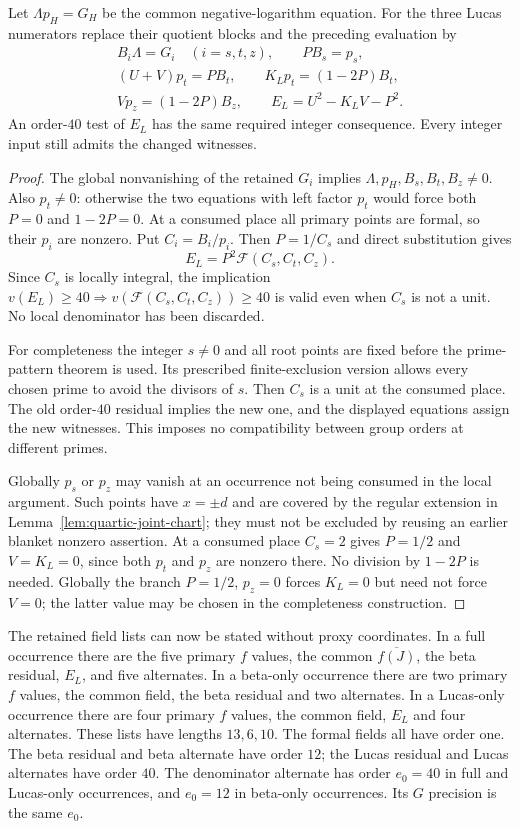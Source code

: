 \begin{lemma}
\label{lem:quartic-normalized-lucas}
Let $\Lambda p_H=G_H$ be the common negative-logarithm equation. For the
three Lucas numerators replace their quotient blocks and the preceding
evaluation by
\begin{gather*}
 B_i\Lambda=G_i\quad(i=s,t,z),\qquad P B_s=p_s,\\
 (U+V)p_t=P B_t,\qquad K_Lp_t=(1-2P)B_t,\\
 Vp_z=(1-2P)B_z,\qquad E_L=U^2-K_LV-P^2.
\end{gather*}
An order-$40$ test of $E_L$ has the same required integer consequence.
Every integer input still admits the changed witnesses.
\end{lemma}
\begin{proof}
The global nonvanishing of the retained $G_i$ implies
$\Lambda,p_H,B_s,B_t,B_z\ne0$. Also $p_t\ne0$: otherwise the two
equations with left factor $p_t$ would force both $P=0$ and $1-2P=0$.
At a consumed place all primary points are formal, so their $p_i$ are
nonzero. Put $C_i=B_i/p_i$. Then $P=1/C_s$ and direct substitution gives
\[
 E_L=P^2\mathcal F(C_s,C_t,C_z).
\]
Since $C_s$ is locally integral, the implication
$v(E_L)\ge40\Rightarrow v(\mathcal F(C_s,C_t,C_z))\ge40$ is valid even
when $C_s$ is not a unit. No local denominator has been discarded.

For completeness the integer $s\ne0$ and all root points are fixed before
the prime-pattern theorem is used. Its prescribed finite-exclusion version
allows every chosen prime to avoid the divisors of $s$. Then $C_s$ is a
unit at the consumed place. The old order-$40$ residual implies the new
one, and the displayed equations assign the new witnesses. This imposes
no compatibility between group orders at different primes.

Globally $p_s$ or $p_z$ may vanish at an occurrence not being consumed in
the local argument. Such points have $x=\pm d$ and are covered by the
regular extension in Lemma~\ref{lem:quartic-joint-chart}; they must not be
excluded by reusing an earlier blanket nonzero assertion. At a consumed
place $C_s=2$ gives $P=1/2$ and $V=K_L=0$, since both $p_t$ and $p_z$
are nonzero there. No division by $1-2P$ is needed. Globally the branch
$P=1/2$, $p_z=0$ forces $K_L=0$ but need not force $V=0$; the latter
value may be chosen in the completeness construction.
\end{proof}

The retained field lists can now be stated without proxy coordinates.
In a full occurrence there are the five primary $f$ values, the common
$\overline{f(J)}$, the beta residual, $E_L$, and five alternates.
In a beta-only occurrence there are two primary $f$ values, the common
field, the beta residual and two alternates. In a Lucas-only occurrence
there are four primary $f$ values, the common field, $E_L$ and four
alternates. These lists have lengths $13,6,10$. The formal fields all have
order one. The beta residual and beta alternate have order $12$; the
Lucas residual and Lucas alternates have order $40$. The denominator
alternate has order $e_0=40$ in full and Lucas-only occurrences, and
$e_0=12$ in beta-only occurrences. Its $G$ precision is the same $e_0$.

